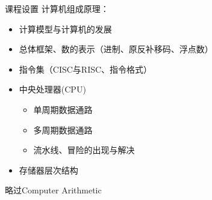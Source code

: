 \documentclass{myslide}
\begin{document}
\begin{frame}{课程设置}
计算机组成原理：
\begin{itemize}
	\item 计算模型与计算机的发展
	\item 总体框架、数的表示（进制、原反补移码、浮点数）
	\item 指令集（CISC与RISC、指令格式）%
	\item 中央处理器(CPU)
	\begin{itemize}
		\item 单周期数据通路
		\item 多周期数据通路
		\item 流水线、冒险的出现与解决
	\end{itemize}
	\item 存储器层次结构
\end{itemize}
略过Computer Arithmetic
\end{frame}
\end{document}
